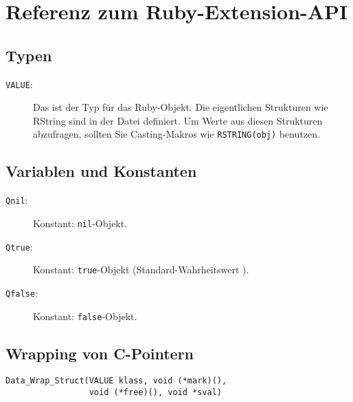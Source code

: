 \chapter{Referenz zum Ruby-Extension-API}
\label{cha:api-referenz}

\section{Typen}
\label{sec:api:typen}

\begin{description}
\item[\texttt{VALUE}:] Das ist der Typ für das Ruby-Objekt. Die
  eigentlichen Strukturen wie \zB RString sind in der Datei
   definiert. Um Werte aus diesen Strukturen abzufragen,
  sollten Sie Casting-Makros wie \verb+RSTRING(obj)+ benutzen.
\end{description}

\section{Variablen und Konstanten}
\label{sec:api:variablen-konstanten}

\begin{description}
\item[\texttt{Qnil}:] Konstant: \verb+nil+-Objekt.
\item[\texttt{Qtrue}:] Konstant: \verb+true+-Objekt
  (Standard-Wahrheitswert ).
\item[\texttt{Qfalse}:] Konstant: \verb+false+-Objekt.
\end{description}

\section{Wrapping von C-Pointern}
\label{sec:api:c-pointer}

\begin{lstlisting}
Data_Wrap_Struct(VALUE klass, void (*mark)(),
                 void (*free)(), void *sval)
\end{lstlisting}

